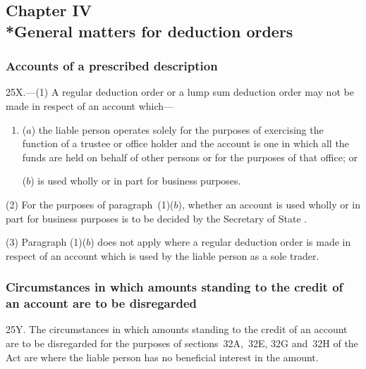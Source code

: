\documentclass[12pt,a4paper]{article}
\begin{document}
\subsection[Chapter IV --- General matters for deduction orders]{Chapter IV\\*General matters for deduction orders}

\renewcommand\parthead{--- Part IIIA Chapter IV}

\subsubsection[25X. Accounts of a prescribed description]{Accounts of a prescribed description}

25X.---(1)  A regular deduction order or a lump sum deduction order may not be made in respect of an account which—
\begin{enumerate}\item[]
($a$) the liable person operates solely for the purposes of exercising the function of a trustee or office holder and the account is one in which all the funds are held on behalf of other persons or for the purposes of that office; or

($b$) is used wholly or in part for business purposes.
\end{enumerate}

(2) For the purposes of paragraph~(1)($b$), whether an account is used wholly or in part for business purposes is to be decided by the 
Secretary of State%
.

(3) Paragraph (1)($b$)  does not apply where a regular deduction order is made in respect of an account which is used by the liable person as a sole trader.


\subsubsection[25Y. Circumstances in which amounts standing to the credit of an account are to be disregarded]{Circumstances in which amounts standing to the credit of an account are to be disregarded}

25Y.  The circumstances in which amounts standing to the credit of an account are to be disregarded for the purposes of sections~32A,~32E, 32G and~32H of the Act are where the liable person has no beneficial interest in the amount.
\end{document}
